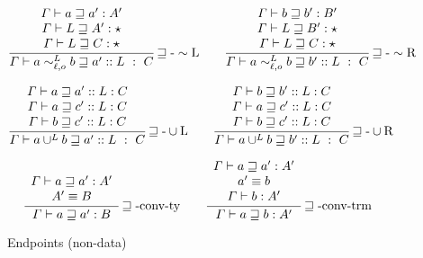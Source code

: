 \begin{figure}
\begin{align*}
  \frac{\begin{array}{c}
  \varGamma\vdash a\sqsupseteq a':A'\\
  \varGamma\vdash L\sqsupseteq A':\star\\
  \varGamma\vdash L\sqsupseteq C:\star
  \end{array}}{\varGamma\vdash a\sim_{\ell,o}^{L}b\sqsupseteq a'::L\ :\ C}\rulename{\sqsupseteq-\sim L}
  \quad & \quad 
  \frac{\begin{array}{c}
  \varGamma\vdash b\sqsupseteq b':B'\\
  \varGamma\vdash L\sqsupseteq B':\star\\
  \varGamma\vdash L\sqsupseteq C:\star
  \end{array}}{\varGamma\vdash a\sim_{\ell,o}^{L}b\sqsupseteq b'::L\ :\ C}\rulename{\sqsupseteq-\sim R}
\\
\end{align*}

\begin{align*}
  \frac{\begin{array}{c}
  \varGamma\vdash a\sqsupseteq a'::L:C\\
  \varGamma\vdash a\sqsupseteq c'::L:C\\
  \varGamma\vdash b\sqsupseteq c'::L:C
  \end{array}}{\varGamma\vdash a\cup^{L}b\sqsupseteq a'::L\ :\ C}\rulename{\sqsupseteq-\cup L}
  \quad & \quad 
  \frac{\begin{array}{c}
  \varGamma\vdash b\sqsupseteq b'::L:C\\
  \varGamma\vdash a\sqsupseteq c'::L:C\\
  \varGamma\vdash b\sqsupseteq c'::L:C
  \end{array}}{\varGamma\vdash a\cup^{L}b\sqsupseteq b'::L\ :\ C}\rulename{\sqsupseteq-\cup R}
\\
\end{align*}

\begin{align*}
  \frac{\begin{array}{c}
  \varGamma\vdash a\sqsupseteq a':A'\\
  A'\equiv B
  \end{array}}{\varGamma\vdash a\sqsupseteq a':B}\operatorname{\sqsupseteq-conv-ty}
  \quad & \quad 
  \frac{\begin{array}{c}
  \varGamma\vdash a\sqsupseteq a':A'\\
  a'\equiv b\\
  \varGamma\vdash b:A'
  \end{array}}{\varGamma\vdash a\sqsupseteq b:A'}\operatorname{\sqsupseteq-conv-trm}
\\
\end{align*}

\caption{Endpoints (non-data)}
\label{fig:cast-endpoint-rules}
\end{figure}
 
